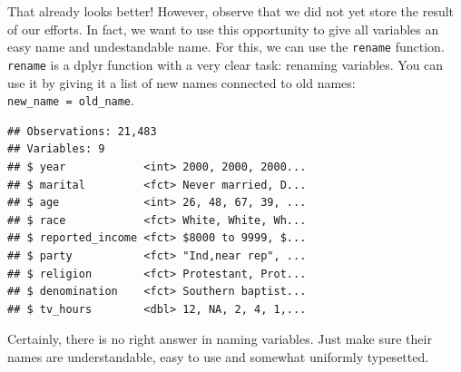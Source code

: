 \documentclass[]{tufte-book}
\newenvironment{Shaded}{}{}
\newcommand{\KeywordTok}[1]{\textcolor[rgb]{0.00,0.44,0.13}{\textbf{#1}}}
\newcommand{\DataTypeTok}[1]{\textcolor[rgb]{0.56,0.13,0.00}{#1}}
\newcommand{\StringTok}[1]{\textcolor[rgb]{0.25,0.44,0.63}{#1}}
\newcommand{\OperatorTok}[1]{\textcolor[rgb]{0.40,0.40,0.40}{#1}}
\newcommand{\NormalTok}[1]{#1}
\begin{document}
That already looks better! However, observe that we did not yet store
the result of our efforts. In fact, we want to use this opportunity to
give all variables an easy name and undestandable name. For this, we can
use the \texttt{rename} function. \texttt{rename} is a dplyr function
with a very clear task: renaming variables. You can use it by giving it
a list of new names connected to old names:
\texttt{new\_name\ =\ old\_name}.

\begin{Shaded}
\end{Shaded}

\begin{verbatim}
## Observations: 21,483
## Variables: 9
## $ year            <int> 2000, 2000, 2000...
## $ marital         <fct> Never married, D...
## $ age             <int> 26, 48, 67, 39, ...
## $ race            <fct> White, White, Wh...
## $ reported_income <fct> $8000 to 9999, $...
## $ party           <fct> "Ind,near rep", ...
## $ religion        <fct> Protestant, Prot...
## $ denomination    <fct> Southern baptist...
## $ tv_hours        <dbl> 12, NA, 2, 4, 1,...
\end{verbatim}

Certainly, there is no right answer in naming variables. Just make sure
their names are understandable, easy to use and somewhat uniformly
typesetted.
\end{document}
